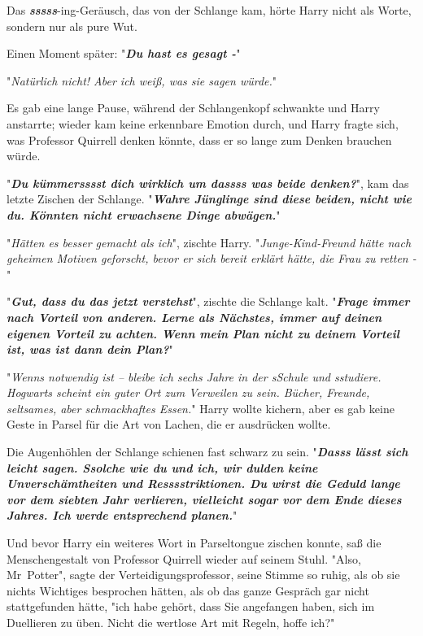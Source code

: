 {Das \textbf{\emph{sssss}}-ing-Geräusch, das von der Schlange kam, hörte Harry nicht als Worte, sondern nur als pure Wut.

Einen Moment später: "\textbf{\emph{Du hast es gesagt -}}"

"\emph{Natürlich nicht! Aber ich weiß, was sie sagen würde.}"

Es gab eine lange Pause, während der Schlangenkopf schwankte und Harry anstarrte; wieder kam keine erkennbare Emotion durch, und Harry fragte sich, was Professor Quirrell denken könnte, dass er so lange zum Denken brauchen würde.

"\textbf{\emph{Du kümmersssst dich wirklich um dassss was beide denken?}}", kam das letzte Zischen der Schlange. "\textbf{\emph{Wahre Jünglinge sind diese beiden, nicht wie du. Könnten nicht erwachsene Dinge abwägen.}}"

"\emph{Hätten es besser gemacht als ich}", zischte Harry. "\emph{Junge-Kind-Freund hätte nach geheimen Motiven geforscht, bevor er sich bereit erklärt hätte, die Frau zu retten -}"

"\textbf{\emph{Gut, dass du das jetzt verstehst}}", zischte die Schlange kalt. "\textbf{\emph{Frage immer nach Vorteil von anderen. Lerne als Nächstes, immer auf deinen eigenen Vorteil zu achten. Wenn mein Plan nicht zu deinem Vorteil ist, was ist dann dein Plan?}}"

"\emph{Wenns notwendig ist -- bleibe ich sechs Jahre in der sSchule und sstudiere. Hogwarts scheint ein guter Ort zum Verweilen zu sein. Bücher, Freunde, seltsames, aber schmackhaftes Essen.}" Harry wollte kichern, aber es gab keine Geste in Parsel für die Art von Lachen, die er ausdrücken wollte.

Die Augenhöhlen der Schlange schienen fast schwarz zu sein. "\textbf{\emph{Dasss lässt sich leicht sagen. Ssolche wie du und ich, wir dulden keine Unverschämtheiten und Resssstriktionen. Du wirst die Geduld lange vor dem siebten Jahr verlieren, vielleicht sogar vor dem Ende dieses Jahres. Ich werde entsprechend planen.}}"

Und bevor Harry ein weiteres Wort in Parseltongue zischen konnte, saß die Menschengestalt von Professor Quirrell wieder auf seinem Stuhl. "Also, Mr~Potter", sagte der Verteidigungsprofessor, seine Stimme so ruhig, als ob sie nichts Wichtiges besprochen hätten, als ob das ganze Gespräch gar nicht stattgefunden hätte, "ich habe gehört, dass Sie angefangen haben, sich im Duellieren zu üben. Nicht die wertlose Art mit Regeln, hoffe ich?"

}

